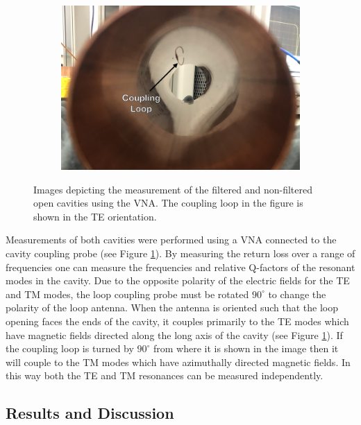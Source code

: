 \begin{figure}[htbp]
\begin{subfigure}{0.48\textwidth}
        \caption{}
    \end{subfigure}
    \hfill
    \begin{subfigure}{0.48\textwidth}
        \includegraphics*[width=\textwidth]{figs/Chapter-6/230612_coupling_loop.png}
        \caption{}
    \end{subfigure}
    \caption{\label{fig:chap6-prototype-cav-meas-images} Images depicting the measurement of the filtered and non-filtered open cavities using the VNA. The coupling loop in the figure is shown in the TE orientation.}
\end{figure}

Measurements of both cavities were performed using a VNA connected to the cavity coupling probe (see Figure \ref{fig:chap6-prototype-cav-meas-images}). By measuring the return loss over a range of frequencies one can measure the frequencies and relative Q-factors of the resonant modes in the cavity. Due to the opposite polarity of the electric fields for the TE and TM modes, the loop coupling probe must be rotated $90^\circ$ to change the polarity of the loop antenna. When the antenna is oriented such that the loop opening faces the ends of the cavity, it couples primarily to the TE modes which have magnetic fields directed along the long axis of the cavity (see Figure \ref{fig:chap6-prototype-cav-meas-images}). If the coupling loop is turned by $90^\circ$ from where it is shown in the image then it will couple to the TM modes which have azimuthally directed magnetic fields. In this way both the TE and TM resonances can be measured independently. 

\subsection{Results and Discussion}

